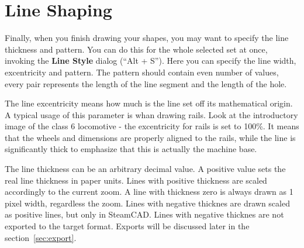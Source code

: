 \section{Line Shaping}

Finally, when you finish drawing your shapes, you may want to specify the line
thickness and pattern. You can do this for the whole selected set at once, invoking
the \textbf{Line Style} dialog (``Alt + S''). Here you can specify the line width,
excentricity and pattern. The pattern should contain even number of values, every
pair represents the length of the line segment and the length of the hole.

The line excentricity means how much is the line set off its mathematical origin.
A typical usage of this parameter is whan drawing rails. Look at the introductory
image of the class 6 locomotive - the excentricity for rails is set to 100\%.
It means that the wheels and dimensions are properly aligned to the rails, while
the line is significantly thick to emphasize that this is actually the machine
base.

The line thickness can be an arbitrary decimal value. A positive value sets the
real line thickness in paper units. Lines with positive thickness are scaled
accordingly to the current zoom. A line with thickness zero is always drawn
as 1 pixel width, regardless the zoom. Lines with negative thicknes are drawn
scaled as positive lines, but only in SteamCAD. Lines with negative
thicknes are not exported to the target format. Exports will be discussed later
in the section~\ref{sec:export}.



